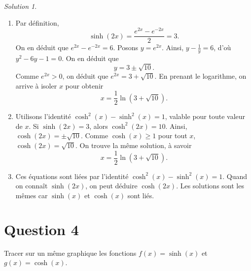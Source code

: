 \documentclass[
  12pt,
  letterpaper,
]{book}
\theoremstyle{remark}
\newtheorem*{solution}{Solution}
\begin{document}
\begin{solution}

\begin{enumerate}
\def\labelenumi{\arabic{enumi}.}
\item
  Par définition, \[\sinh(2x) = \dfrac{e^{2x} - e^{-2x}}{2} = 3.\] On en
  déduit que \(e^{2x} - e^{-2x} = 6\). Posons \(y = e^{2x}\). Ainsi,
  \(y - \frac{1}{y} = 6\), d'où \(y^2 - 6y - 1 = 0\). On en déduit que
  \[y = 3\pm \sqrt{10}.\] Comme \(e^{2x} > 0\), on déduit que
  \(e^{2x} = 3 + \sqrt{10}\). En prenant le logarithme, on arrive à
  isoler \(x\) pour obtenir
  \[x = \frac{1}{2}\ln\left(3 + \sqrt{10}\right).\]
\item
  Utilisons l'identité \(\cosh^2(x) - \sinh^2(x) = 1\), valable pour
  toute valeur de \(x\). Si \(\sinh(2x) = 3\), alors
  \(\cosh^2(2x) = 10\). Ainsi, \(\cosh(2x) = \pm\sqrt{10}\). Comme
  \(\cosh(x) \geq 1\) pour tout \(x\), \(\cosh(2x) = \sqrt{10}\). On
  trouve la même solution, à savoir
  \[x = \frac{1}{2}\ln\left(3 + \sqrt{10}\right).\]
\item
  Ces équations sont liées par l'identité
  \(\cosh^2(x) - \sinh^2(x) = 1\). Quand on connaît \(\sinh(2x)\), on
  peut déduire \(\cosh(2x)\). Les solutions sont les mêmes car
  \(\sinh(x)\) et \(\cosh(x)\) sont liés.
\end{enumerate}

\end{solution}

\hypertarget{question-4-3}{%
\section{Question 4}\label{question-4-3}}

Tracer sur un même graphique les fonctions \(f(x) = \sinh(x)\) et
\(g(x) = \cosh(x)\).
\end{document}
